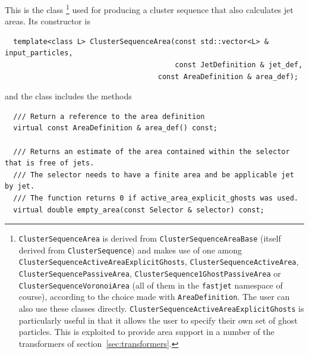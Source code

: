 \documentclass[12pt,a4]{article}
\begin{document}
This is the class%
%
\footnote{  
  \texttt{ClusterSequenceArea} is derived from
  \texttt{ClusterSequenceAreaBase} (itself derived from
  \texttt{ClusterSequence}) and makes use of one among
  \texttt{ClusterSequenceActiveAreaExplicitGhosts}, 
  \texttt{ClusterSequenceActiveArea}, 
  \texttt{ClusterSequencePassiveArea},
  \texttt{ClusterSequence1GhostPassiveArea} or 
  \texttt{ClusterSequenceVoronoiArea} (all of them in the \texttt{fastjet}
  namespace of course), according to the choice
  made with \texttt{AreaDefinition}. The user can also use these
  classes directly.
  \texttt{ClusterSequenceActiveAreaExplicitGhosts} is particularly
  useful in that it allows the user to specify their own set of ghost
  particles.
  This is exploited to provide area support in a number of the
  transformers of section~\ref{sec:transformers}.
}
%
used for producing a cluster sequence that also calculates jet areas.
Its constructor is
\begin{lstlisting}
  template<class L> ClusterSequenceArea(const std::vector<L> & input_particles, 
                                        const JetDefinition & jet_def,
	                                const AreaDefinition & area_def);
\end{lstlisting}
and the class includes the methods
\begin{lstlisting}
  /// Return a reference to the area definition
  virtual const AreaDefinition & area_def() const; 

  /// Returns an estimate of the area contained within the selector that is free of jets. 
  /// The selector needs to have a finite area and be applicable jet by jet.
  /// The function returns 0 if active_area_explicit_ghosts was used.
  virtual double empty_area(const Selector & selector) const;
\end{lstlisting}
\end{document}
